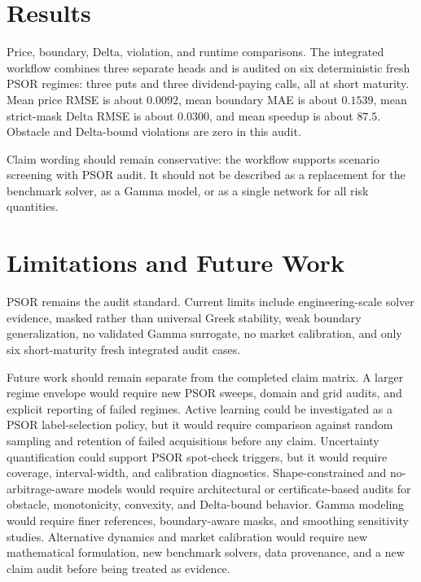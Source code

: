 \documentclass[11pt]{article}
\begin{document}
\section{Results}
Price, boundary, Delta, violation, and runtime comparisons. The integrated
workflow combines three separate heads and is audited on six deterministic
fresh PSOR regimes: three puts and three dividend-paying calls, all at short
maturity. Mean price RMSE is about \(0.0092\), mean boundary MAE is about
\(0.1539\), mean strict-mask Delta RMSE is about \(0.0300\), and mean speedup
is about \(87.5\). Obstacle and Delta-bound violations are zero in this audit.

Claim wording should remain conservative: the workflow supports scenario screening with PSOR audit. It should not be described as a replacement for the benchmark solver, as a Gamma model, or as a single network for all risk quantities.

\section{Limitations and Future Work}
PSOR remains the audit standard. Current limits include engineering-scale
solver evidence, masked rather than universal Greek stability, weak boundary
generalization, no validated Gamma surrogate, no market calibration, and only
six short-maturity fresh integrated audit cases.

Future work should remain separate from the completed claim matrix. A larger regime envelope would require new PSOR sweeps, domain and grid audits, and explicit reporting of failed regimes. Active learning could be investigated as a PSOR label-selection policy, but it would require comparison against random sampling and retention of failed acquisitions before any claim. Uncertainty quantification could support PSOR spot-check triggers, but it would require coverage, interval-width, and calibration diagnostics. Shape-constrained and no-arbitrage-aware models would require architectural or certificate-based audits for obstacle, monotonicity, convexity, and Delta-bound behavior. Gamma modeling would require finer references, boundary-aware masks, and smoothing sensitivity studies. Alternative dynamics and market calibration would require new mathematical formulation, new benchmark solvers, data provenance, and a new claim audit before being treated as evidence.



\end{document}
